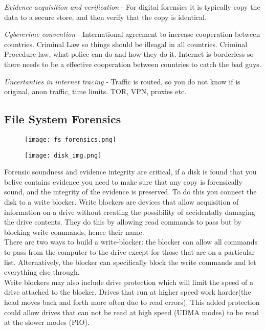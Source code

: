 \textit{Evidence acquisition and verification} - For digital forensics it is typically
copy the data to a secure store, and then verify that the copy is
identical.

\textit{Cybercrime convention} - International agreement to increase cooperation
between countries. Criminal Law so things should be illeagal in all
countries. Criminal Procedure law, what police can do and how they do it.
Internet is borderless so there needs to be a effective cooperation
between countries to catch the bad guys.

\textit{Uncertanties in internet tracing} - Traffic is routed, so you do not
know if is original, anon traffic, time limits. TOR, VPN, proxies etc.

\subsection{File System Forensics}
\begin{figure}[h]
    \centering\texttt{[image: fs\_forensics.png]}
\end{figure}
\begin{figure}[h]
    \centering\texttt{[image: disk\_img.png]}
\end{figure}

Forensic soundness and evidence integrity are critical, if a disk is found that
you belive contains evidence you need to make sure that any copy is forensically
sound, and the integrity of the evidence is preserved. To do this you connect
the disk to a write blocker. Write blockers are devices that allow acquisition 
of information on a drive without creating the possibility of accidentally 
damaging the drive contents. They do this by allowing read commands to pass but 
by blocking write commands, hence their name.\\

There are two ways to build a write-blocker: the blocker can allow all commands 
to pass from the computer to the drive except for those that are on a particular
list. Alternatively, the blocker can specifically block the write commands and 
let everything else through.\\

Write blockers may also include drive protection which will limit the speed of a
drive attached to the blocker. Drives that run at higher speed work harder(the 
head moves back and forth more often due to read errors). This added protection 
could allow drives that can not be read at high speed (UDMA modes) to be read at 
the slower modes (PIO).\\

